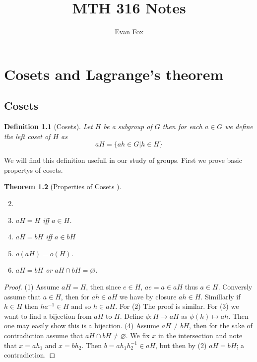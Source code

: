 \documentclass[11pt]{report}
\author{Evan Fox}
\title{MTH 316 Notes}
\theoremstyle{break}
\newtheorem{thm}{Theorem}[section]
\newtheorem{defn}[thm]{Definition}
\begin{document}
\maketitle

\chapter{Cosets and Lagrange's theorem}

\section{Cosets}
\begin{defn}[Cosets] 
    Let $H$ be a subgroup of $G$ then for each $a \in G$ we define the left coset of $H$ as 
    \[aH = \{ah \in G | h \in H\} \]
\end{defn}
We will find this definition usefull in our study of groups. First we prove basic propertys of cosets. 

\begin{thm}[Properties of Cosets ] 

    \begin{enumerate}
        \setcounter{enumiv}{1}
        \item []
        \item $aH = H$ iff $a \in H$.
        \item $aH = bH$ iff $a \in bH$
        \item $o(aH) = o(H)$.
        \item $aH = bH$ or $aH \cap bH = \varnothing$.
        
    \end{enumerate}
\end{thm}

\begin{proof}
   (1) Assume $aH = H$, then since $e \in H$, $ae = a \in aH$ thus $a \in H$. Conversly assume that $a \in H$, then for $ah \in aH$ we 
   have by closure $ah \in H$. Simillarly if $h \in H$ then $ha^{-1} \in H$ and so $h \in aH$. For (2) The proof is similar. For (3) we 
   want to find a bijection from $aH$ to $H$. Define $\phi : H \to aH$ as $\phi(h) \mapsto ah$. Then one may easily show this is a bijection. 
   (4) Assume $aH \neq bH$, then for the sake of contradiction assume that $aH \cap bH \neq \varnothing$. We fix $x$ in the intersection 
   and note that $x = ah_1$ and $x = bh_2$. Then $b = ah_1 h_2^{-1} \in aH$, but then by (2) $aH = bH$; a contradiction.     
\end{proof}
\end{document}
